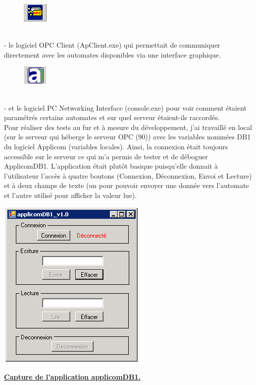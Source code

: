 \documentclass[a4paper,12pt]{extarticle}
\newcommand{\espace}{\vspace{0.3cm}}
\begin{document}
\begin{figure}
	\includegraphics[scale=1]{Img/logo/logo_OPClient.PNG} 
\end{figure}

\textbf{ }\\
- le logiciel OPC Client (ApClient.exe) qui permettait de communiquer directement avec les automates disponibles via une interface graphique.

\begin{figure}
	\includegraphics[scale=1]{Img/logo/logo_PCNetInt.PNG} 
\end{figure}

\textbf{ }\\
- et le logiciel PC Networking Interface (console.exe) pour voir comment étaient paramétrés certains automates et sur quel serveur étaient-ils raccordés.\\

Pour réaliser des tests au fur et à mesure du développement, j’ai travaillé en local (sur le serveur qui héberge le serveur OPC (90)) avec les variables nommées DB1 du logiciel Applicom (variables locales). Ainsi, la connexion était toujours accessible sur le serveur ce qui m’a permis de tester et de déboguer ApplicomDB1. L'application était plutôt basique puisqu’elle donnait à l’utilisateur l’accès à quatre boutons (Connexion, Déconnexion, Envoi et Lecture) et à deux champs de texte (un pour pouvoir envoyer une donnée vers l’automate et l’autre utilisé pour afficher la valeur lue).\\

\centerline{\includegraphics[scale=1]{Img/Capture_applicomDB1v1.PNG}}
\centerline{\textbf{\underline{Capture de l’application applicomDB1.}}}
\espace{}
\end{document}
